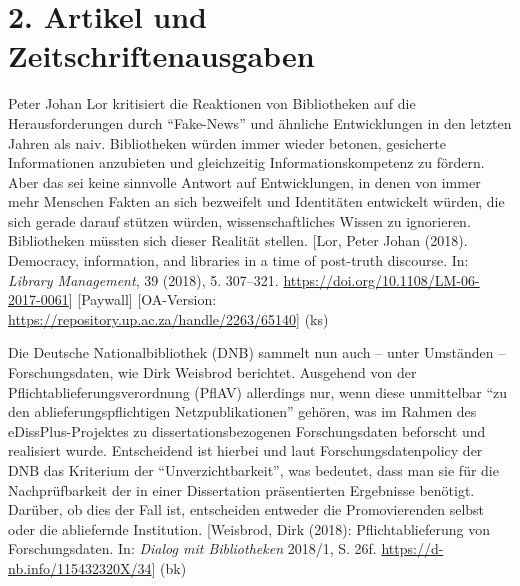 \documentclass[a4paper,
fontsize=11pt,
oneside,
numbers=noperiodatend,
parskip=half-,
bibliography=totoc,
final
]{scrartcl}
\begin{document}
\hypertarget{artikel-und-zeitschriftenausgaben}{%
\section{2. Artikel und
Zeitschriftenausgaben}\label{artikel-und-zeitschriftenausgaben}}

Peter Johan Lor kritisiert die Reaktionen von Bibliotheken auf die
Herausforderungen durch \enquote{Fake-News} und ähnliche Entwicklungen
in den letzten Jahren als naiv. Bibliotheken würden immer wieder
betonen, gesicherte Informationen anzubieten und gleichzeitig
Informationskompetenz zu fördern. Aber das sei keine sinnvolle Antwort
auf Entwicklungen, in denen von immer mehr Menschen Fakten an sich
bezweifelt und Identitäten entwickelt würden, die sich gerade darauf
stützen würden, wissenschaftliches Wissen zu ignorieren. Bibliotheken
müssten sich dieser Realität stellen. {[}Lor, Peter Johan (2018).
Democracy, information, and libraries in a time of post-truth discourse.
In: \emph{Library Management}, 39 (2018), 5. 307--321.
\url{https://doi.org/10.1108/LM-06-2017-0061}{]} {[}Paywall{]}
{[}OA-Version: \url{https://repository.up.ac.za/handle/2263/65140}{]}
(ks)

Die Deutsche Nationalbibliothek (DNB) sammelt nun auch -- unter
Umständen -- Forschungsdaten, wie Dirk Weisbrod berichtet. Ausgehend von
der Pflichtablieferungsverordnung (PflAV) allerdings nur, wenn diese
unmittelbar \enquote{zu den ablieferungspflichtigen Netzpublikationen}
gehören, was im Rahmen des eDissPlus-Projektes zu dissertationsbezogenen
Forschungsdaten beforscht und realisiert wurde. Entscheidend ist hierbei
und laut Forschungsdatenpolicy der DNB das Kriterium der
\enquote{Unverzichtbarkeit}, was bedeutet, dass man sie für die
Nachprüfbarkeit der in einer Dissertation präsentierten Ergebnisse
benötigt. Darüber, ob dies der Fall ist, entscheiden entweder die
Promovierenden selbst oder die abliefernde Institution. {[}Weisbrod,
Dirk (2018): Pflichtablieferung von Forschungsdaten. In: \emph{Dialog
mit Bibliotheken} 2018/1, S. 26f.
\url{https://d-nb.info/115432320X/34}{]} (bk)
\end{document}
